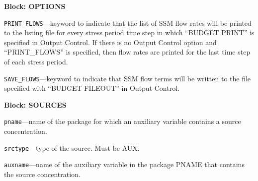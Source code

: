 
\item \textbf{Block: OPTIONS}

\begin{description}
\item \texttt{PRINT\_FLOWS}---keyword to indicate that the list of SSM flow rates will be printed to the listing file for every stress period time step in which ``BUDGET PRINT'' is specified in Output Control.  If there is no Output Control option and ``PRINT\_FLOWS'' is specified, then flow rates are printed for the last time step of each stress period.

\item \texttt{SAVE\_FLOWS}---keyword to indicate that SSM flow terms will be written to the file specified with ``BUDGET FILEOUT'' in Output Control.

\end{description}
\item \textbf{Block: SOURCES}

\begin{description}
\item \texttt{pname}---name of the package for which an auxiliary variable contains a source concentration.

\item \texttt{srctype}---type of the source.  Must be AUX.

\item \texttt{auxname}---name of the auxiliary variable in the package PNAME that contains the source concentration.

\end{description}

